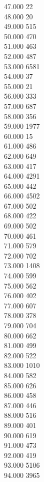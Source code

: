 { 47.000	22 \\
 48.000	20 \\
 49.000	515 \\
 50.000	470 \\
 51.000	463 \\
 52.000	487 \\
 53.000	6581 \\
 54.000	37 \\
 55.000	21 \\
 56.000	333 \\
 57.000	687 \\
 58.000	356 \\
 59.000	1977 \\
 60.000	15 \\
 61.000	486 \\
 62.000	649 \\
 63.000	417 \\
 64.000	4291 \\
 65.000	442 \\
 66.000	4502 \\
 67.000	502 \\
 68.000	422 \\
 69.000	502 \\
 70.000	461 \\
 71.000	579 \\
 72.000	702 \\
 73.000	1408 \\
 74.000	599 \\
 75.000	562 \\
 76.000	402 \\
 77.000	607 \\
 78.000	378 \\
 79.000	704 \\
 80.000	662 \\
 81.000	499 \\
 82.000	522 \\
 83.000	1010 \\
 84.000	582 \\
 85.000	626 \\
 86.000	458 \\
 87.000	446 \\
 88.000	516 \\
 89.000	401 \\
 90.000	619 \\
 91.000	473 \\
 92.000	419 \\
 93.000	5106 \\
 94.000	3965 \\
}
